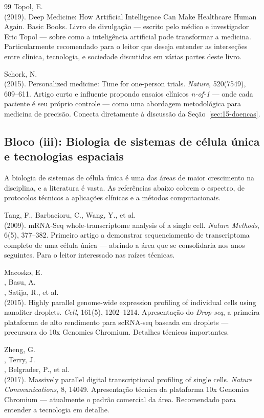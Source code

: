 \begin{thebibliography}{99}
 Topol, E.\\ (2019). Deep Medicine: How Artificial Intelligence Can Make Healthcare Human Again. Basic Books. Livro de divulgação --- escrito pelo médico e investigador Eric Topol --- sobre como a inteligência artificial pode transformar a medicina. Particularmente recomendado para o leitor que deseja entender as interseções entre clínica, tecnologia, e sociedade discutidas em várias partes deste livro.

 Schork, N.\\ (2015). Personalized medicine: Time for one-person trials. \emph{Nature}, 520(7549), 609--611. Artigo curto e influente propondo ensaios clínicos \emph{n-of-1} --- onde cada paciente é seu próprio controle --- como uma abordagem metodológica para medicina de precisão. Conecta diretamente à discussão da Seção~\ref{sec:15-doencas}.



\subsection*{Bloco (iii): Biologia de sistemas de célula única e tecnologias espaciais}

A biologia de sistemas de célula única é uma das áreas de maior crescimento na disciplina, e a literatura é vasta. As referências abaixo cobrem o espectro, de protocolos técnicos a aplicações clínicas e a métodos computacionais.

 Tang, F., Barbacioru, C., Wang, Y., et al.\\ (2009). mRNA-Seq whole-transcriptome analysis of a single cell. \emph{Nature Methods}, 6(5), 377--382. Primeiro artigo a demonstrar sequenciamento de transcriptoma completo de uma célula única --- abrindo a área que se consolidaria nos anos seguintes. Para o leitor interessado nas raízes técnicas.

 Macosko, E.\\, Basu, A.\\, Satija, R., et al.\\ (2015). Highly parallel genome-wide expression profiling of individual cells using nanoliter droplets. \emph{Cell}, 161(5), 1202--1214. Apresentação do \emph{Drop-seq}, a primeira plataforma de alto rendimento para scRNA-seq baseada em droplets --- precursora do 10x Genomics Chromium. Detalhes técnicos importantes.

 Zheng, G.\\, Terry, J.\\, Belgrader, P., et al.\\ (2017). Massively parallel digital transcriptional profiling of single cells. \emph{Nature Communications}, 8, 14049. Apresentação técnica da plataforma 10x Genomics Chromium --- atualmente o padrão comercial da área. Recomendado para entender a tecnologia em detalhe.


\end{thebibliography}
